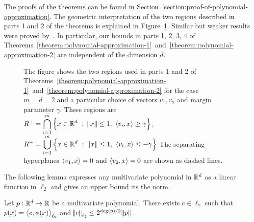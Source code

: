 The proofs of the theorems can be found in
Section~\ref{section:proof-of-polynomial-approximation}. The geometric
interpretation of the two regions described in parts 1 and 2 of the theorems is
explained in Figure~\ref{figure:pizza-slice}. Similar but weaker results were
proved by~\citet{Klivans-Servedio-2008}. In particular, our bounds in parts 1,
2, 3, 4 of
Theorems~\ref{theorem:polynomial-approximation-1}~and~\ref{theorem:polynomial-approximation-2}
are independent of the dimension $d$.

\begin{figure}
\begin{center}

\end{center}
\caption[]{The figure shows the two regions used in parts 1 and 2 of
Theorems~\ref{theorem:polynomial-approximation-1}~and~\ref{theorem:polynomial-approximation-2}
for the case $m=d=2$ and a particular choice of vectors $v_1, v_2$ and margin
parameter $\gamma$. These regions are
$R^+ = \displaystyle \bigcap_{i=1}^m \left\{ x \in \mathbb{R}^d ~:~ \norm{x} \le 1, \ \left\langle v_i, x \right\rangle \ge \gamma \right\}$,
$R^- = \displaystyle \bigcup_{i=1}^m \left\{ x \in \mathbb{R}^d ~:~ \norm{x} \le 1, \ \left\langle v_i, x \right\rangle \le - \gamma \right\}$
The separating hyperplanes $\left\langle v_1, x \right\rangle = 0$ and $\left\langle v_2, x \right\rangle = 0$ are shown as dashed lines.}
\label{figure:pizza-slice}
\end{figure}

The following lemma expresses any multivariate polynomial in $\mathbb{R}^d$
as a linear function in $\ell_2$ and gives an upper bound its the norm.

\begin{lemma}
\label{lemma:norm-bound}
Let $p:\mathbb{R}^d \to \mathbb{R}$ be a multivariate polynomial.
There exists $c \in \ell_2$ such that $p(x) = \left\langle c, \phi(x) \right\rangle_{\ell_2}$
and $\norm{c}_{\ell_2} \le 2^{\deg(p)/2} \norm{p}$.
\end{lemma}

